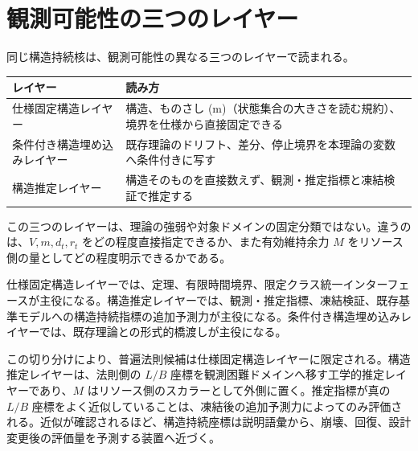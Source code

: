 \documentclass[12pt,a4paper]{article}
\begin{document}
\section{観測可能性の三つのレイヤー}\label{ux89b3ux6e2cux53efux80fdux6027ux306eux4e09ux3064ux306eux30ecux30a4ux30e4ux30fc}

同じ構造持続核は、観測可能性の異なる三つのレイヤーで読まれる。

{\def\LTcaptype{table} %
\begin{longtable}[]{@{}
  >{\raggedright\arraybackslash}p{}
  >{\raggedright\arraybackslash}p{}@{}}
\toprule\noalign{}
\begin{minipage}[b]{\linewidth}\raggedright
レイヤー
\end{minipage} & \begin{minipage}[b]{\linewidth}\raggedright
読み方
\end{minipage} \\
\midrule\noalign{}
\endhead
\bottomrule\noalign{}
\endlastfoot
仕様固定構造レイヤー & 構造、ものさし (m)（状態集合の大きさを読む規約）、境界を仕様から直接固定できる \\
条件付き構造埋め込みレイヤー & 既存理論のドリフト、差分、停止境界を本理論の変数へ条件付きに写す \\
構造推定レイヤー & 構造そのものを直接数えず、観測・推定指標と凍結検証で推定する \\
\end{longtable}
}

この三つのレイヤーは、理論の強弱や対象ドメインの固定分類ではない。違うのは、\(V,m,d_{t},r_{t}\) をどの程度直接指定できるか、また有効維持余力 \(M\) をリソース側の量としてどの程度明示できるかである。

仕様固定構造レイヤーでは、定理、有限時間境界、限定クラス統一インターフェースが主役になる。構造推定レイヤーでは、観測・推定指標、凍結検証、既存基準モデルへの構造持続指標の追加予測力が主役になる。条件付き構造埋め込みレイヤーでは、既存理論との形式的橋渡しが主役になる。

この切り分けにより、普遍法則候補は仕様固定構造レイヤーに限定される。構造推定レイヤーは、法則側の \(L/B\) 座標を観測困難ドメインへ移す工学的推定レイヤーであり、\(M\) はリソース側のスカラーとして外側に置く。推定指標が真の \(L/B\) 座標をよく近似していることは、凍結後の追加予測力によってのみ評価される。近似が確認されるほど、構造持続座標は説明語彙から、崩壊、回復、設計変更後の評価量を予測する装置へ近づく。
\end{document}
